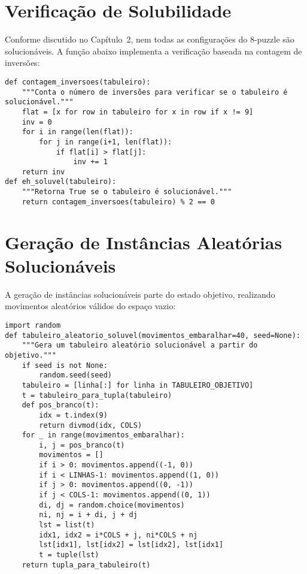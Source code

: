\section{Verificação de Solubilidade}  
Conforme discutido no Capítulo~2, nem todas as configurações do 8-puzzle são solucionáveis. A função abaixo implementa a verificação baseada na contagem de inversões:  
\begin{verbatim}  
def contagem_inversoes(tabuleiro):  
    """Conta o número de inversões para verificar se o tabuleiro é solucionável."""  
    flat = [x for row in tabuleiro for x in row if x != 9]  
    inv = 0  
    for i in range(len(flat)):  
        for j in range(i+1, len(flat)):  
            if flat[i] > flat[j]:  
                inv += 1  
    return inv  
def eh_soluvel(tabuleiro):  
    """Retorna True se o tabuleiro é solucionável."""  
    return contagem_inversoes(tabuleiro) % 2 == 0  
\end{verbatim}  
  
\section{Geração de Instâncias Aleatórias Solucionáveis}  
A geração de instâncias solucionáveis parte do estado objetivo, realizando movimentos aleatórios válidos do espaço vazio:  
\begin{verbatim}  
import random  
def tabuleiro_aleatorio_soluvel(movimentos_embaralhar=40, seed=None):  
    """Gera um tabuleiro aleatório solucionável a partir do objetivo."""  
    if seed is not None:  
        random.seed(seed)  
    tabuleiro = [linha[:] for linha in TABULEIRO_OBJETIVO]  
    t = tabuleiro_para_tupla(tabuleiro)  
    def pos_branco(t):  
        idx = t.index(9)  
        return divmod(idx, COLS)  
    for _ in range(movimentos_embaralhar):  
        i, j = pos_branco(t)  
        movimentos = []  
        if i > 0: movimentos.append((-1, 0))  
        if i < LINHAS-1: movimentos.append((1, 0))  
        if j > 0: movimentos.append((0, -1))  
        if j < COLS-1: movimentos.append((0, 1))  
        di, dj = random.choice(movimentos)  
        ni, nj = i + di, j + dj  
        lst = list(t)  
        idx1, idx2 = i*COLS + j, ni*COLS + nj  
        lst[idx1], lst[idx2] = lst[idx2], lst[idx1]  
        t = tuple(lst)  
    return tupla_para_tabuleiro(t)  
\end{verbatim}  
  
